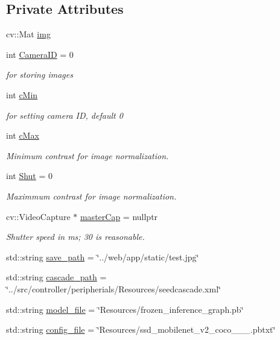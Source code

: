 \subsection*{Private Attributes}
\begin{DoxyCompactItemize}
\item 
cv\+::\+Mat \hyperlink{classCamera_a9a184f1522b055612f5ede1cc2443457}{img}
\item 
int \hyperlink{classCamera_a96c19741cb6ba7a897ca90746e8b8918}{Camera\+ID} = 0
\begin{DoxyCompactList}\small\item\em for storing images \end{DoxyCompactList}\item 
int \hyperlink{classCamera_ab6f982f42917eb9ef75606e97fc82911}{c\+Min}
\begin{DoxyCompactList}\small\item\em for setting camera ID, default 0 \end{DoxyCompactList}\item 
int \hyperlink{classCamera_ad784af65b7f7e1b6ebb9b33df774d7db}{c\+Max}
\begin{DoxyCompactList}\small\item\em Minimum contrast for image normalization. \end{DoxyCompactList}\item 
int \hyperlink{classCamera_ad3d6176cdcccecd116f2e7867b642ad1}{Shut} = 0
\begin{DoxyCompactList}\small\item\em Maximmum contrast for image normalization. \end{DoxyCompactList}\item 
cv\+::\+Video\+Capture $\ast$ \hyperlink{classCamera_af32d4a5550c35edb96c9e81fb4208adb}{master\+Cap} = nullptr
\begin{DoxyCompactList}\small\item\em Shutter speed in ms; 30 is reasonable. \end{DoxyCompactList}\item 
std\+::string \hyperlink{classCamera_a1ed93fa883066dfbc6fa88b267aefabe}{save\+\_\+path} = \char`\"{}../web/app/static/test.\+jpg\char`\"{}
\item 
std\+::string \hyperlink{classCamera_a7f9dcee329ab710d227afa3eb8f6e4a3}{cascade\+\_\+path} = \char`\"{}../src/controller/peripherials/Resources/seedcascade.\+xml\char`\"{}
\item 
std\+::string \hyperlink{classCamera_a22a0754fc359b253e203ce59026021a0}{model\+\_\+file} = \char`\"{}Resources/frozen\+\_\+inference\+\_\+graph.\+pb\char`\"{}
\item 
std\+::string \hyperlink{classCamera_affbb5356cbe1e069d4e107ccda0d1b2b}{config\+\_\+file} = \char`\"{}Resources/ssd\+\_\+mobilenet\+\_\+v2\+\_\+coco\+\_\+\_\+\_.\+pbtxt\char`\"{}
\end{DoxyCompactItemize}


